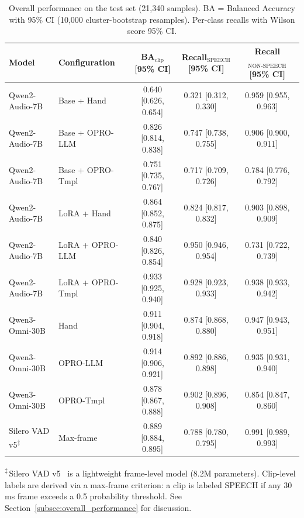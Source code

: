 \begin{table}[t]
\centering
\caption{Overall performance on the test set (21,340 samples). BA = Balanced Accuracy with 95\% CI (10,000 cluster-bootstrap resamples). Per-class recalls with Wilson score 95\% CI.}
\label{tab:overall_performance}
\footnotesize
\setlength{\tabcolsep}{3pt}
\renewcommand{\arraystretch}{1.12}
\begin{tabular}{llccc}
\toprule
\textbf{Model} & \textbf{Configuration} & \textbf{BA$_{\text{clip}}$ [95\% CI]} & \textbf{Recall$_{\text{SPEECH}}$ [95\% CI]} & \textbf{Recall$_{\text{NON-SPEECH}}$ [95\% CI]} \\
\midrule
Qwen2-Audio-7B & Base + Hand & 0.640 [0.626, 0.654] & 0.321 [0.312, 0.330] & 0.959 [0.955, 0.963] \\
Qwen2-Audio-7B & Base + OPRO-LLM & 0.826 [0.814, 0.838] & 0.747 [0.738, 0.755] & 0.906 [0.900, 0.911] \\
Qwen2-Audio-7B & Base + OPRO-Tmpl & 0.751 [0.735, 0.767] & 0.717 [0.709, 0.726] & 0.784 [0.776, 0.792] \\
\midrule
Qwen2-Audio-7B & LoRA + Hand & 0.864 [0.852, 0.875] & 0.824 [0.817, 0.832] & 0.903 [0.898, 0.909] \\
Qwen2-Audio-7B & LoRA + OPRO-LLM & 0.840 [0.826, 0.854] & 0.950 [0.946, 0.954] & 0.731 [0.722, 0.739] \\
Qwen2-Audio-7B & LoRA + OPRO-Tmpl & 0.933 [0.925, 0.940] & 0.928 [0.923, 0.933] & 0.938 [0.933, 0.942] \\
\midrule
Qwen3-Omni-30B & Hand & 0.911 [0.904, 0.918] & 0.874 [0.868, 0.880] & 0.947 [0.943, 0.951] \\
Qwen3-Omni-30B & OPRO-LLM & 0.914 [0.906, 0.921] & 0.892 [0.886, 0.898] & 0.935 [0.931, 0.940] \\
Qwen3-Omni-30B & OPRO-Tmpl & 0.878 [0.867, 0.888] & 0.902 [0.896, 0.908] & 0.854 [0.847, 0.860] \\
\midrule
Silero VAD v5\textsuperscript{$\ddagger$} & Max-frame & 0.889 [0.884, 0.895] & 0.788 [0.780, 0.795] & 0.991 [0.989, 0.993] \\
\bottomrule
\end{tabular}

\vspace{0.3em}
\begin{flushleft}
\footnotesize
\textsuperscript{$\ddagger$}\,Silero VAD v5~\cite{silero_vad_github} is a lightweight frame-level model (8.2M parameters). Clip-level labels are derived via a max-frame criterion: a clip is labeled SPEECH if any 30\,ms frame exceeds a 0.5 probability threshold. See Section~\ref{subsec:overall_performance} for discussion.
\end{flushleft}
\end{table}